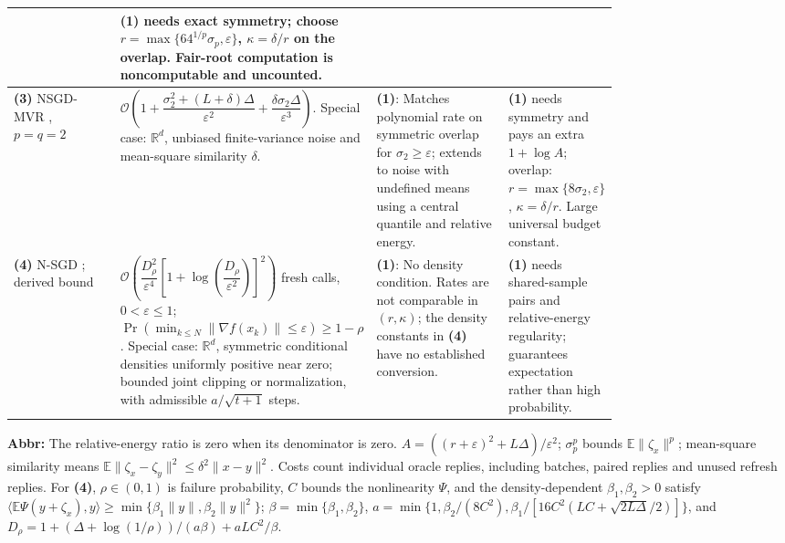 \begin{table}[tp]
\begin{threeparttable}
\begin{tabularx}{\linewidth}{@{}>{\raggedright\arraybackslash}p{0.20\linewidth}>{\raggedright\arraybackslash}p{0.32\linewidth}>{\raggedright\arraybackslash}p{0.25\linewidth}>{\raggedright\arraybackslash}X@{}}
& \textbf{(1)} needs exact symmetry; choose $r=\max\{64^{1/p}\sigma_p,\varepsilon\}$, $\kappa=\delta/r$ on the overlap. Fair-root computation is noncomputable and uncounted. \\
\midrule
\textbf{(3)} NSGD-MVR \citep[Thm.~4.2, v2]{mshFradin2026v2}, $p=q=2$
& $\mathcal O\!\left(1+\dfrac{\sigma_2^2+(L+\delta)\Delta}{\varepsilon^2}+\dfrac{\delta\sigma_2\Delta}{\varepsilon^3}\right)$.
Special case: $\mathbb R^d$, unbiased finite-variance noise and mean-square similarity $\delta$.
& \textbf{(1)}: Matches polynomial rate on symmetric overlap for $\sigma_2\ge\varepsilon$; extends to noise with undefined means using a central quantile and relative energy.
& \textbf{(1)} needs symmetry and pays an extra $1+\log A$; overlap: $r=\max\{8\sigma_2,\varepsilon\}$, $\kappa=\delta/r$. Large universal budget constant. \\
\midrule
\textbf{(4)} N-SGD \citep[Thm.~1, v2]{resnArmacki2026v2}; derived bound
& $\mathcal O\!\left(\dfrac{D_\rho^2}{\varepsilon^4}\left[1+\log\!\left(\dfrac{D_\rho}{\varepsilon^2}\right)\right]^2\right)$ fresh calls, $0<\varepsilon\le1$;
$\Pr(\min_{k\le N}\|\nabla f(x_k)\|\le\varepsilon)\ge1-\rho$.
Special case: $\mathbb R^d$, symmetric conditional densities uniformly positive near zero; bounded joint clipping or normalization, with admissible $a/\sqrt{t+1}$ steps.
& \textbf{(1)}: No density condition. Rates are not comparable in $(r,\kappa)$; the density constants in \textbf{(4)} have no established conversion.
& \textbf{(1)} needs shared-sample pairs and relative-energy regularity; guarantees expectation rather than high probability. \\
\bottomrule
\end{tabularx}
\begin{tablenotes}[flushleft]\footnotesize
\item[] \textbf{Abbr:} The relative-energy ratio is zero when its denominator is zero. $A=((r+\varepsilon)^2+L\Delta)/\varepsilon^2$; $\sigma_p^p$ bounds $\mathbb E\|\zeta_x\|^p$; mean-square similarity means $\mathbb E\|\zeta_x-\zeta_y\|^2\le\delta^2\|x-y\|^2$. Costs count individual oracle replies, including batches, paired replies and unused refresh replies. For \textbf{(4)}, $\rho\in(0,1)$ is failure probability, $C$ bounds the nonlinearity $\Psi$, and the density-dependent $\beta_1,\beta_2>0$ satisfy $\langle\mathbb E\Psi(y+\zeta_x),y\rangle\ge\min\{\beta_1\|y\|,\beta_2\|y\|^2\}$; $\beta=\min\{\beta_1,\beta_2\}$, $a=\min\{1,\beta_2/(8C^2),\beta_1/[16C^2(LC+\sqrt{2L\Delta}/2)]\}$, and $D_\rho=1+(\Delta+\log(1/\rho))/(a\beta)+aLC^2/\beta$.
\end{tablenotes}
\end{threeparttable}
\end{table}
